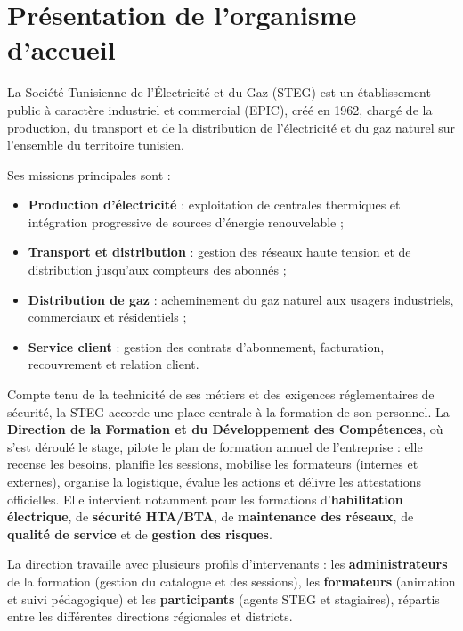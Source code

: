\documentclass[12pt,a4paper]{report}
\begin{document}
\section{Présentation de l'organisme d'accueil}

La Société Tunisienne de l'Électricité et du Gaz (STEG) est un établissement public à caractère industriel et commercial (EPIC), créé en 1962, chargé de la production, du transport et de la distribution de l'électricité et du gaz naturel sur l'ensemble du territoire tunisien.

Ses missions principales sont :
\begin{itemize}
    \item \textbf{Production d'électricité} : exploitation de centrales thermiques et intégration progressive de sources d'énergie renouvelable ;
    \item \textbf{Transport et distribution} : gestion des réseaux haute tension et de distribution jusqu'aux compteurs des abonnés ;
    \item \textbf{Distribution de gaz} : acheminement du gaz naturel aux usagers industriels, commerciaux et résidentiels ;
    \item \textbf{Service client} : gestion des contrats d'abonnement, facturation, recouvrement et relation client.
\end{itemize}

Compte tenu de la technicité de ses métiers et des exigences réglementaires de sécurité, la STEG accorde une place centrale à la formation de son personnel. La \textbf{Direction de la Formation et du Développement des Compétences}, où s'est déroulé le stage, pilote le plan de formation annuel de l'entreprise : elle recense les besoins, planifie les sessions, mobilise les formateurs (internes et externes), organise la logistique, évalue les actions et délivre les attestations officielles. Elle intervient notamment pour les formations d'\textbf{habilitation électrique}, de \textbf{sécurité HTA/BTA}, de \textbf{maintenance des réseaux}, de \textbf{qualité de service} et de \textbf{gestion des risques}.

La direction travaille avec plusieurs profils d'intervenants : les \textbf{administrateurs} de la formation (gestion du catalogue et des sessions), les \textbf{formateurs} (animation et suivi pédagogique) et les \textbf{participants} (agents STEG et stagiaires), répartis entre les différentes directions régionales et districts.

\end{document}
